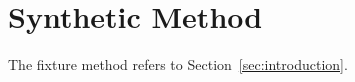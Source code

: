 \section{Synthetic Method}
\label{sec:method}
The fixture method refers to Section~\ref{sec:introduction}.
